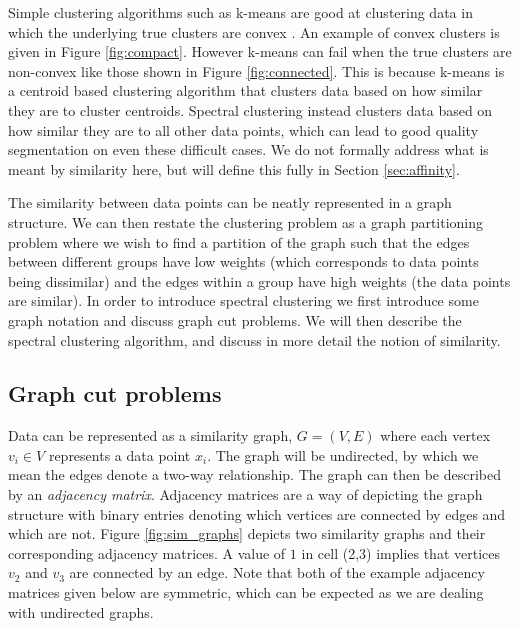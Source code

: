 Simple clustering algorithms such as k-means are good at clustering data in which the underlying true clusters are convex \citep{Everitt2001}. An example of convex clusters is given in Figure \ref{fig:compact}. However k-means can fail when the true clusters are non-convex like those shown in Figure \ref{fig:connected}. This is because k-means is a centroid based clustering algorithm that clusters data based on how similar they are to cluster centroids. Spectral clustering instead clusters data based on how similar they are to all other data points, which can lead to good quality segmentation on even these difficult cases.  We do not formally address what is meant by similarity here, but will define this fully in Section \ref{sec:affinity}.


The similarity between data points can be neatly represented in a graph structure.  We can then restate the clustering problem as a graph partitioning problem where we wish to find a partition of the graph such that the edges between different groups have low weights (which corresponds to data points being dissimilar) and the edges within a group have high weights (the data points are similar). In order to introduce spectral clustering we first introduce some graph notation and discuss graph cut problems. We will then describe the spectral clustering algorithm, and discuss in more detail the notion of similarity. 

\subsection{Graph cut problems} 

Data can be represented as a similarity graph, $G = (V,E)$ where each vertex $v_i \in V$ represents a data point $x_i$. The graph will be undirected, by which we mean the edges denote a two-way relationship.  The graph can then be described by an \textit{adjacency matrix}. Adjacency matrices are a way of depicting the graph structure with binary entries denoting which vertices are connected by edges and which are not. Figure \ref{fig:sim_graphs} depicts two similarity graphs and their corresponding adjacency matrices. A  value of $1$ in cell (2,3) implies that vertices $v_2$ and $v_3$ are connected by an edge. Note that both of the example adjacency matrices given below are symmetric, which can be expected as we are dealing with undirected graphs. 

